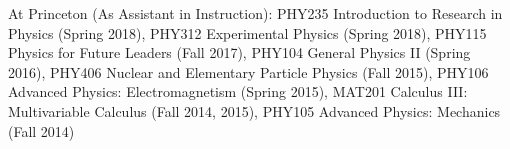 \documentclass[letterpaper,11pt]{article}
\newenvironment{packed_itemize}{
\begin{itemize}[label=\raisebox{0.25ex}{\tiny$\bullet$}]
  \setlength{\itemsep}{4.0pt}
  \setlength{\parskip}{0pt}
  \setlength{\parsep}{0pt}}{\end{itemize}
}
\begin{document}
\noindent
At Princeton (As Assistant in Instruction):  {\scriptsize PHY235 Introduction to Research in Physics (Spring 2018), PHY312 Experimental Physics (Spring 2018), PHY115 Physics for Future Leaders (Fall 2017), PHY104 General Physics II (Spring 2016), PHY406 Nuclear and Elementary Particle Physics (Fall 2015), PHY106 Advanced Physics: Electromagnetism (Spring 2015), MAT201 Calculus III: Multivariable Calculus (Fall 2014, 2015), PHY105 Advanced Physics: Mechanics (Fall 2014)}
%
%
%
\end{document}
